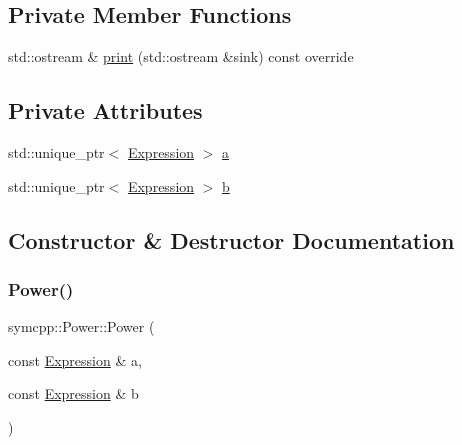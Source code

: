 \subsection*{Private Member Functions}
\begin{DoxyCompactItemize}
\item 
std\+::ostream \& \mbox{\hyperlink{classsymcpp_1_1Power_aeddeec10b104818656e7f2f1536abccc}{print}} (std\+::ostream \&sink) const override
\end{DoxyCompactItemize}
\subsection*{Private Attributes}
\begin{DoxyCompactItemize}
\item 
std\+::unique\+\_\+ptr$<$ \mbox{\hyperlink{classsymcpp_1_1Expression}{Expression}} $>$ \mbox{\hyperlink{classsymcpp_1_1Power_aa36a8b5499b378ec9bd705ea9a9e77ce}{a}}
\item 
std\+::unique\+\_\+ptr$<$ \mbox{\hyperlink{classsymcpp_1_1Expression}{Expression}} $>$ \mbox{\hyperlink{classsymcpp_1_1Power_add4b954bcfa942f2d14ed40713d92ad8}{b}}
\end{DoxyCompactItemize}


\subsection{Constructor \& Destructor Documentation}
\mbox{\label{classsymcpp_1_1Power_a2771cf0de9510c3e3d09476504c608f4}} 
\subsubsection{\texorpdfstring{Power()}{Power()}\hspace{0.1cm}{\footnotesize\ttfamily [1/3]}}
{\footnotesize\ttfamily symcpp\+::\+Power\+::\+Power (\begin{DoxyParamCaption}\item[{const \mbox{\hyperlink{classsymcpp_1_1Expression}{Expression}} \&}]{a,  }\item[{const \mbox{\hyperlink{classsymcpp_1_1Expression}{Expression}} \&}]{b }\end{DoxyParamCaption})}

\mbox{\label{classsymcpp_1_1Power_a1d97fafc9c111460aa8690951045f214}} 

